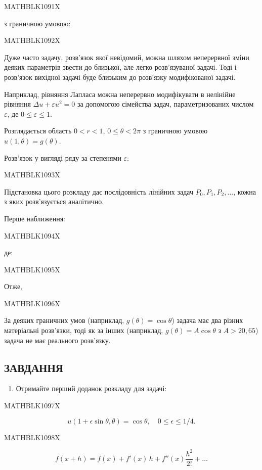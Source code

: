 \documentclass[
  ukrainian,
]{article}
\providecommand{\tightlist}{%
  \setlength{\itemsep}{0pt}\setlength{\parskip}{0pt}}
\begin{document}
MATHBLK1091X

з граничною умовою:

MATHBLK1092X

Дуже часто задачу, розв'язок якої невідомий, можна шляхом неперервної
зміни деяких параметрів звести до близької, але легко розв'язуваної
задачі. Тоді і розв'язок вихідної задачі буде близьким до розв'язку
модифікованої задачі.

Наприклад, рівняння Лапласа можна неперервно модифікувати в нелінійне
рівняння \(\Delta u + \varepsilon u^2 = 0\) за допомогою сімейства
задач, параметризованих числом \(\varepsilon\), де
\(0 \le \varepsilon \le 1\).

Розглядається область \(0 < r < 1\), \(0 \le \theta < 2\pi\) з граничною
умовою \(u(1,\theta) = g(\theta)\).

Розв'язок у вигляді ряду за степенями \(\varepsilon\):

MATHBLK1093X

Підстановка цього розкладу дає послідовність лінійних задач
\(P_0, P_1, P_2, \ldots\), кожна з яких розв'язується аналітично.

Перше наближення:

MATHBLK1094X

де:

MATHBLK1095X

Отже,

MATHBLK1096X

За деяких граничних умов (наприклад, \(g(\theta) = \cos\theta\)) задача
має два різних матеріальні розв'язки, тоді як за інших (наприклад,
\(g(\theta) = A\cos\theta\) з \(A > 20{,}65\)) задача не має реального
розв'язку.

\subsection{ЗАВДАННЯ}\label{ux437ux430ux432ux434ux430ux43dux43dux44f-20}

\begin{enumerate}
\def\labelenumi{\arabic{enumi}.}
\tightlist
\item
  Отримайте перший доданок розкладу для задачі:
\end{enumerate}

MATHBLK1097X

\[
u(1+\epsilon\sin\theta, \theta) = \cos\theta, \quad 0 \le \epsilon \le 1/4.
\]

MATHBLK1098X

\[
f(x+h) = f(x) + f'(x)\,h + f''(x)\frac{h^2}{2!} + \dots
\]
\end{document}
